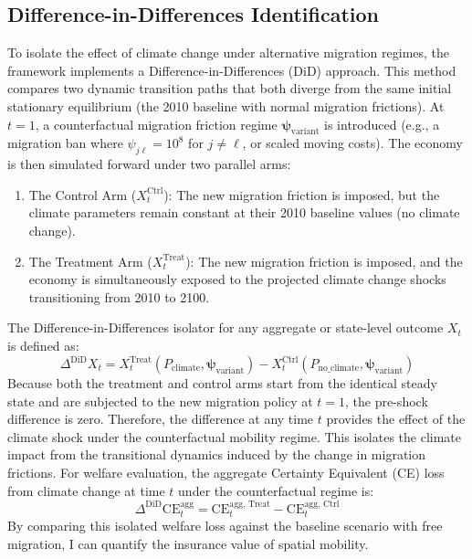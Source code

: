 \documentclass[12pt, a4paper]{article}
\begin{document}
\subsection{Difference-in-Differences Identification}
To isolate the effect of climate change under alternative migration regimes, the framework implements a Difference-in-Differences (DiD) approach. This method compares two dynamic transition paths that both diverge from the  same initial stationary equilibrium (the 2010 baseline with normal migration frictions).
At $t=1$, a counterfactual migration friction regime $\boldsymbol{\psi}_{\text{variant}}$ is introduced (e.g., a migration ban where $\psi_{j\ell} = 10^8$ for $j \neq \ell$, or scaled moving costs). The economy is then simulated forward under two parallel arms:
\begin{enumerate}[noitemsep]
    \item The Control Arm ($X_t^{\text{Ctrl}}$): The new migration friction is imposed, but the climate parameters remain constant at their 2010 baseline values (no climate change).
    \item The Treatment Arm ($X_t^{\text{Treat}}$): The new migration friction is imposed, and the economy is simultaneously exposed to the projected climate change shocks transitioning from 2010 to 2100.
\end{enumerate}
The Difference-in-Differences isolator for any aggregate or state-level outcome $X_t$ is defined as:
\begin{equation}
    \Delta^{\text{DiD}} X_t = X_t^{\text{Treat}}\left(P_{\text{climate}}, \boldsymbol{\psi}_{\text{variant}}\right) - X_t^{\text{Ctrl}}\left(P_{\text{no\_climate}}, \boldsymbol{\psi}_{\text{variant}}\right)
\end{equation}
Because both the treatment and control arms start from the identical steady state and are subjected to the new migration policy at $t=1$, the pre-shock difference is zero. Therefore, the difference at any time $t$ provides the effect of the climate shock under the counterfactual mobility regime. This isolates the climate impact from the transitional dynamics induced by the change in migration frictions.
For welfare evaluation, the aggregate Certainty Equivalent (CE) loss from climate change at time $t$ under the counterfactual regime is:
\begin{equation}
    \Delta^{\text{DiD}} \text{CE}_t^{\text{agg}} = \text{CE}_t^{\text{agg, Treat}} - \text{CE}_t^{\text{agg, Ctrl}}
\end{equation}
By comparing this isolated welfare loss against the baseline scenario with free migration, I can quantify the insurance value of spatial mobility.
\end{document}
